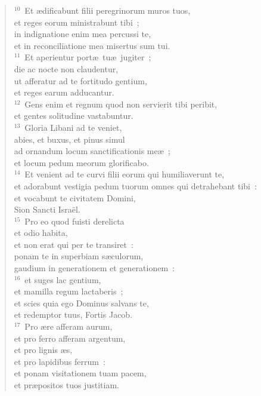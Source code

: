 \begin{flushleft}
\begin{verse}
${}^{10}$~Et \ae dificabunt filii peregrinorum muros tuos,\\ et reges eorum ministrabunt tibi~;\\ in indignatione enim mea percussi te,\\ et in reconciliatione mea misertus sum tui.\\
${}^{11}$~Et aperientur port\ae\ tu\ae\ jugiter~;\\ die ac nocte non claudentur,\\ ut afferatur ad te fortitudo gentium,\\ et reges earum adducantur.\\
${}^{12}$~Gens enim et regnum quod non servierit tibi peribit,\\ et gentes solitudine vastabuntur.\\
${}^{13}$~Gloria Libani ad te veniet,\\ abies, et buxus, et pinus simul\\ ad ornandum locum sanctificationis me\ae~;\\ et locum pedum meorum glorificabo.\\
${}^{14}$~Et venient ad te curvi filii eorum qui humiliaverunt te,\\ et adorabunt vestigia pedum tuorum omnes qui detrahebant tibi~:\\ et vocabunt te civitatem Domini,\\ Sion Sancti Isra\"el.\\
${}^{15}$~Pro eo quod fuisti derelicta\\ et odio habita,\\ et non erat qui per te transiret~:\\ ponam te in superbiam s\ae culorum,\\ gaudium in generationem et generationem~:\\
${}^{16}$~et suges lac gentium,\\ et mamilla regum lactaberis~;\\ et scies quia ego Dominus salvans te,\\ et redemptor tuus, Fortis Jacob.\\
${}^{17}$~Pro \ae re afferam aurum,\\ et pro ferro afferam argentum,\\ et pro lignis \ae s,\\ et pro lapidibus ferrum~:\\ et ponam visitationem tuam pacem,\\ et pr\ae positos tuos justitiam.\\

\end{verse}
\end{flushleft}
